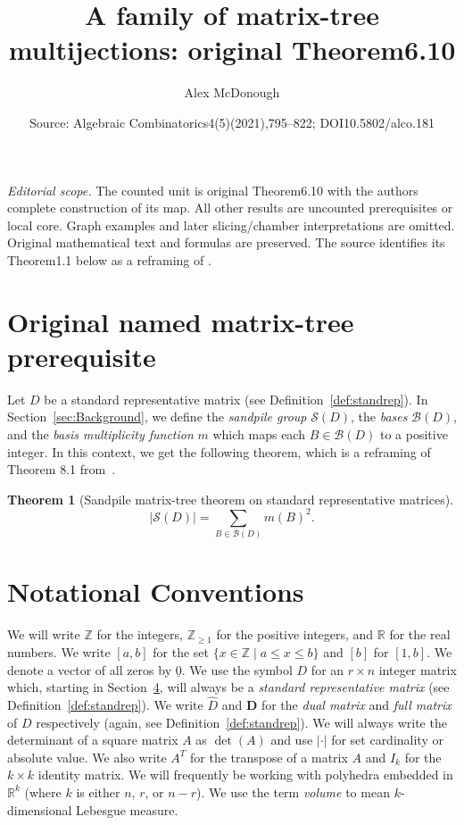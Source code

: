 \documentclass[10pt,a4paper]{amsart}
\title[Geometric matrix-tree multijection]{A family of matrix-tree multijections: original Theorem6.10}
\author{Alex McDonough}
\date{Source: Algebraic Combinatorics4(5)(2021),795--822; DOI10.5802/alco.181}
\newtheorem{theorem}{Theorem}[section]
\theoremstyle{definition}
\newcommand{\un}{\underline}
\newcommand{\R}{\mathbb{R}}
\newcommand{\Z}{\mathbb{Z}}
\newcommand{\D}{\mathbf{D}}
\newcommand{\B}{\mathcal{B}}
\newcommand{\Sand}{\mathcal{S}}
\newcommand{\what}{\widehat}
\begin{document}
\maketitle
\noindent\textit{Editorial scope.} The counted unit is original Theorem6.10 with the author\textquotesingle s complete construction of its map. All other results are uncounted prerequisites or local core. Graph examples and later slicing/chamber interpretations are omitted. Original mathematical text and formulas are preserved. The source identifies its Theorem1.1 below as a reframing of \cite[Theorem8.1]{CutsFlows}.
\section{Original named matrix-tree prerequisite}
Let $D$ be a standard representative matrix (see Definition~\ref{def:standrep}). In Section~\ref{sec:Background}, we define the \emph{sandpile group} $\Sand(D)$, the \emph{bases} $\B(D)$, and the \emph{basis multiplicity function} $m$ which maps each $B \in \B(D)$ to a positive integer. In this context, we get the following theorem, which is a reframing of Theorem 8.1 from~\cite{CutsFlows}.

\begin{theorem}[Sandpile matrix-tree theorem on standard representative matrices]\label{thm:OAmtt} 
\[
|\Sand(D)| = \sum_{B \in \mathcal B(D)} m(B)^2.
\]
\end{theorem}

\section{Notational Conventions}\label{sec:notation}
We will write $\Z$ for the integers, $\Z_{\ge 1}$ for the positive integers, and $\R$ for the real numbers. We write $[a,b]$ for the set $\{x\in \Z\mid a \le x \le b\}$ and $[b]$ for $[1,b]$. We denote a vector of all zeros by $\un 0$. We use the symbol $D$ for an $r \times n$ integer matrix which, starting in Section~\href{https://alco.centre-mersenne.org/articles/10.5802/alco.181/}{4}, will always be a \emph{standard representative matrix} (see Definition~\ref{def:standrep}). We write $\what D$ and $\D$ for the \emph{dual matrix} and \emph{full matrix} of $D$ respectively (again, see Definition~\ref{def:standrep}). We will always write the determinant of a square matrix $A$ as $\det(A)$ and use $| \cdot |$ for set cardinality or absolute value. We also write $A^T$ for the transpose of a matrix $A$ and $I_k$ for the $k \times k$ identity matrix. We will frequently be working with polyhedra embedded in $\R^k$ (where $k$ is either $n$, $r$, or $n-r$). We use the term \emph{volume} to mean $k$-dimensional Lebesgue measure.
\end{document}
